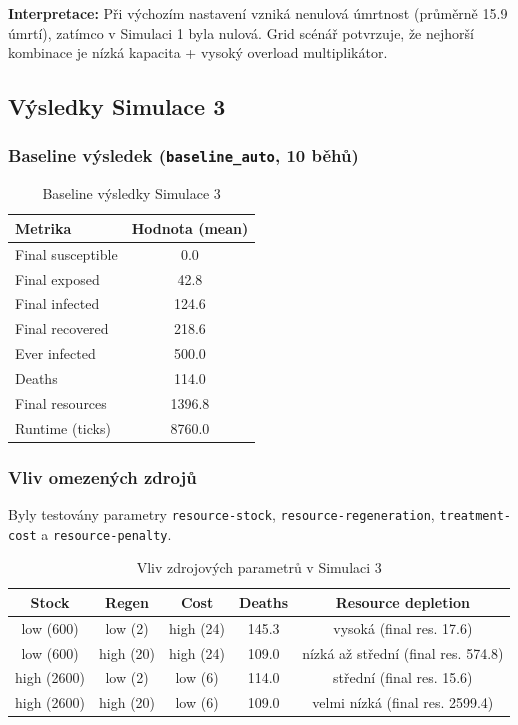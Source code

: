 \textbf{Interpretace:}  
Při výchozím nastavení vzniká nenulová úmrtnost (průměrně 15.9 úmrtí), zatímco v Simulaci 1 byla nulová. Grid scénář potvrzuje, že nejhorší kombinace je nízká kapacita + vysoký overload multiplikátor.

\subsection{Výsledky Simulace 3}

\subsubsection{Baseline výsledek (\texttt{baseline\_auto}, 10 běhů)}

\begin{table}[h]
\centering
\begin{tabular}{l c}
\hline
\textbf{Metrika} & \textbf{Hodnota (mean)} \\
\hline
Final susceptible & 0.0 \\
Final exposed & 42.8 \\
Final infected & 124.6 \\
Final recovered & 218.6 \\
Ever infected & 500.0 \\
Deaths & 114.0 \\
Final resources & 1396.8 \\
Runtime (ticks) & 8760.0 \\
\hline
\end{tabular}
\caption{Baseline výsledky Simulace 3}
\label{tab:s3_baseline}
\end{table}

\subsubsection{Vliv omezených zdrojů}

Byly testovány parametry \texttt{resource-stock}, \texttt{resource-regeneration}, \texttt{treatment-cost} a \texttt{resource-penalty}.

\begin{table}[h]
\centering
\begin{tabular}{c c c c c}
\hline
\textbf{Stock} & \textbf{Regen} & \textbf{Cost} & \textbf{Deaths} & \textbf{Resource depletion} \\
\hline
low (600) & low (2) & high (24) & 145.3 & vysoká (final res. 17.6) \\
low (600) & high (20) & high (24) & 109.0 & nízká až střední (final res. 574.8) \\
high (2600) & low (2) & low (6) & 114.0 & střední (final res. 15.6) \\
high (2600) & high (20) & low (6) & 109.0 & velmi nízká (final res. 2599.4) \\
\hline
\end{tabular}
\caption{Vliv zdrojových parametrů v Simulaci 3}
\label{tab:s3_resources}
\end{table}


